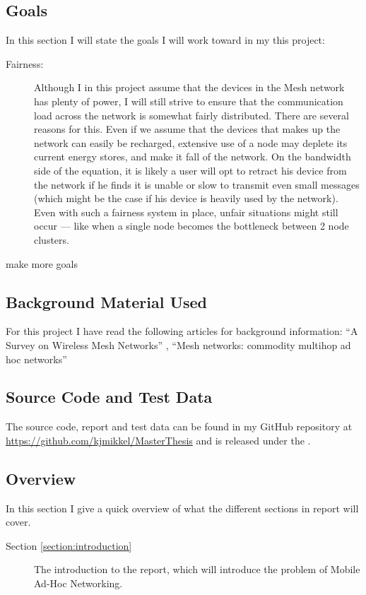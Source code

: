 {\subsection{Goals}
In this section I will state the goals I will work toward in my this project:

\begin{description}
\item[Fairness:] Although I in this project assume that the devices in the Mesh network has plenty of power, I will still strive to ensure that the communication load across the network is somewhat fairly distributed. There are several reasons for this. Even if we assume that the devices that makes up the network can easily be recharged, extensive use of a node may deplete its current energy stores, and make it fall of the network. On the bandwidth side of the equation, it is likely a user will opt to retract his device from the network if he finds it is unable or slow to transmit even small messages (which might be the case if his device is heavily used by the network). Even with such a fairness system in place, unfair situations might still occur --- like when a single node becomes the bottleneck between 2 node clusters. 
\item[make more goals] 
\end{description}

\subsection{Background Material Used}
For this project I have read the following articles for background information: ``A Survey on Wireless Mesh Networks'' \cite{martinWirelessSurvey}, ``Mesh networks: commodity multihop ad hoc networks''\cite{martinMeshnetwork} 

\subsection{Source Code and Test Data}
The source code, report and test data can be found in my GitHub repository at \url{https://github.com/kjmikkel/MasterThesis} and is released under the .

\subsection{Overview}
In this section I give a quick overview of what the different sections in report will cover.
\begin{description}
\item[Section \ref{section:introduction}] The introduction to the report, which will introduce the problem of Mobile Ad-Hoc Networking.
\item[]
\end{description}
}
